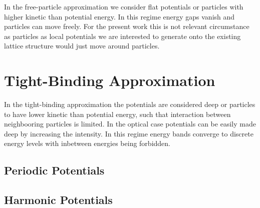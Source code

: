 In the free-particle approximation we consider flat potentials or particles
with higher kinetic than potential energy. In this regime energy gaps
vanish and particles can move freely. For the present work this is not
relevant circumstance as particles as local potentials we are interested
to generate onto the existing lattice structure would just move around
particles.

\section{Tight-Binding Approximation}

In the tight-binding approximation the potentials are considered deep or
particles to have lower kinetic than potential energy, such that interaction
between neighbooring particles is limited. In the optical case potentials can
be easily made deep by increasing the intensity. In this regime energy bands
converge to discrete energy levels with inbetween energies being forbidden.

\subsection{Periodic Potentials}

\subsection{Harmonic Potentials}
